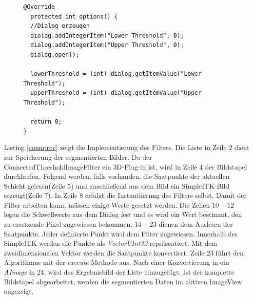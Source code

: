 \begin{figure}[htbp]
\begin{lstlisting}[frame=leftline]
@Override
  protected int options() {
  //Dialog erzeugen
  dialog.addIntegerItem("Lower Threshold", 0);
  dialog.addIntegerItem("Upper Threshold", 0);
  dialog.open();
		
  lowerThreshold = (int) dialog.getItemValue("Lower Threshold");
  upperThreshold = (int) dialog.getItemValue("Upper Threshold");

  return 0;
}
\end{lstlisting}
\end{figure}

Listing \ref{connproc} zeigt die Implementierung des Filters. Die Liste in Zeile $2$ dient zur Speicherung der segmentierten Bilder. Da der ConnectedThresholdImageFilter ein 3D-Plug-in ist, wird in Zeile $4$ der Bildstapel durchlaufen. Folgend werden, falls vorhanden, die Saatpunkte der aktuellen Schicht gelesen(Zeile $5$) und anschließend aus dem Bild ein SimpleITK-Bild erzeugt(Zeile $7$). In Zeile $8$ erfolgt die Instantiierung des Filters selbst. Damit der Filter arbeiten kann, müssen einige Werte gesetzt werden. Die Zeilen $10-12$ legen die Schwellwerte aus dem Dialog fest und es wird ein Wert bestimmt, den zu ersetzende Pixel zugewiesen bekommen. $14-23$ dienen dem Auslesen der Saatpunkte. Jeder definierte Punkt wird dem Filter zugewiesen. Innerhalb des SimpleITK werden die Punkte als \textit{VectorUInt32} repräsentiert. Mit dem zweidimensionalen Vektor werden die Saatpunkte konvertiert. Zeile $23$ führt den Algorithmus mit der \textit{execute}-Methode aus. Nach einer Konvertierung in ein \textit{AImage} in $24$, wird das Ergebnisbild der Liste hinzugefügt. Ist der komplette Bildstapel abgearbeitet, werden die segmentierten Daten im aktiven ImageView angezeigt.

